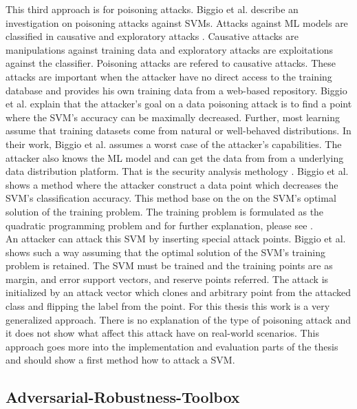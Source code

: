 This third approach is for poisoning attacks. Biggio et al. \cite{DBLP:conf/icml/BiggioNL12} describe an investigation on poisoning attacks against SVMs. Attacks against ML models are classified in causative and exploratory attacks \cite{DBLP:conf/ccs/BarrenoNSJT06}. Causative attacks are manipulations against training data and exploratory attacks are exploitations against the classifier. Poisoning attacks are refered to causative attacks. These attacks are important when the attacker have no direct access to the training database and provides his own training data from a web-based repository. Biggio et al. explain that the attacker's goal on a data poisoning attack is to find a point where the SVM's accuracy can be maximally decreased. Further, most learning assume that training datasets come from natural or well-behaved distributions. In their work, Biggio et al. assumes a worst case of the attacker's capabilities. The attacker also knows the ML model and can get the data from from a underlying data distribution platform. That is the security analysis methology \cite{DBLP:journals/ml/BarrenoNJT10}. Biggio et al. shows a method where the attacker construct a data point which decreases the SVM's classification accuracy. This method base on the on the SVM's optimal solution of the training problem. The training problem is formulated as the quadratic
programming problem and for further explanation, please see \cite{Papadonikolakis2009PerformanceCO}. \\
An attacker can attack this SVM by inserting special attack points. Biggio et al. shows such a way assuming that the optimal solution of the SVM's training problem is retained. The SVM must be trained and the training points are as margin, and error support vectors, and reserve points referred. The attack is initialized by an attack vector which clones and arbitrary point from the attacked class and flipping the label \cite{DBLP:journals/apin/ZhangCZL21} from the point. For this thesis this work is a very generalized approach. There is no explanation of the type of poisoning attack and it does not show what affect this attack have on real-world scenarios. This approach goes more into the implementation and evaluation parts of the thesis and should show a first method how to attack a SVM.


\subsection{Adversarial-Robustness-Toolbox}

